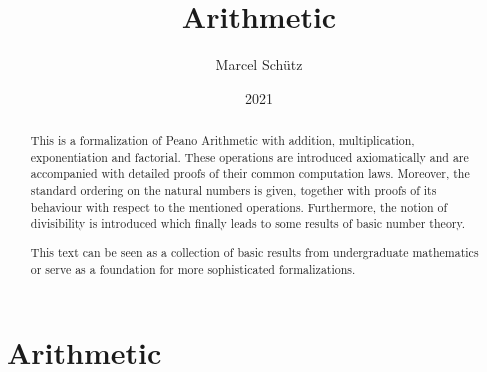 \documentclass{article}
\title{Arithmetic}
\author{Marcel Schütz}
\date{2021}
\begin{document}
  \maketitle

  \begin{abstract}
    This is a formalization of Peano Arithmetic with addition, multiplication,
    exponentiation and factorial.
    These operations are introduced axiomatically and are accompanied with
    detailed proofs of their common computation laws.
    Moreover, the standard ordering on the natural numbers is given, together
    with proofs of its behaviour with respect to the mentioned operations.
    Furthermore, the notion of divisibility is introduced which finally leads
    to some results of basic number theory.

    This text can be seen as a collection of basic results from undergraduate
    mathematics or serve as a foundation for more sophisticated formalizations.
  \end{abstract}

  \tableofcontents

  \newpage
  \part{Arithmetic}

  
  \begin{comment}
    \begin{forthel}
      [readtex \path{arithmetic/sections/01_arithmetic/01_peano-axioms.ftl.tex}]
    \end{forthel}
  \end{comment}

  
  \begin{comment}
    \begin{forthel}
      [readtex \path{arithmetic/sections/01_arithmetic/02_addition.ftl.tex}]
    \end{forthel}
  \end{comment}

  
  \begin{comment}
    \begin{forthel}
      [readtex \path{arithmetic/sections/01_arithmetic/03_multiplication.ftl.tex}]
    \end{forthel}
  \end{comment}
\end{document}
